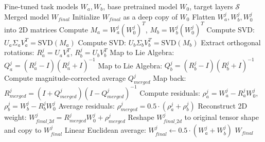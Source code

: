 \documentclass{article}
\begin{document}
\begin{algorithm}[tb]
\caption{Selective OrthoMerge (S-OM)}
\label{alg:selective_orthomerge}
\begin{algorithmic}[1]
 Fine-tuned task models $W_a, W_b$, base pretrained model $W_0$, target layers $\mathcal{S}$
 Merged model $W_{final}$
\STATE Initialize $W_{final}$ as a deep copy of $W_0$
        \STATE Flatten $W^j_a, W^j_b, W^j_0$ into 2D matrices
        \STATE Compute $M_a = W^j_a (W^j_0)^T$, $M_b = W^j_b (W^j_0)^T$
        \STATE Compute SVD: $U_a \Sigma_a V_a^T = \text{SVD}(M_a)$
        \STATE Compute SVD: $U_b \Sigma_b V_b^T = \text{SVD}(M_b)$
        \STATE Extract orthogonal rotations: $R^j_a = U_a V_a^T$, $R^j_b = U_b V_b^T$
        \STATE Map to Lie Algebra: $Q^j_a = (R^j_a - I)(R^j_a + I)^{-1}$
        \STATE Map to Lie Algebra: $Q^j_b = (R^j_b - I)(R^j_b + I)^{-1}$
        \STATE Compute magnitude-corrected average $Q^j_{merged}$
        \STATE Map back: $R^j_{merged} = (I + Q^j_{merged})(I - Q^j_{merged})^{-1}$
        \STATE Compute residuals: $\rho^j_a = W^j_a - R^j_a W^j_0$, $\rho^j_b = W^j_b - R^j_b W^j_0$
        \STATE Average residuals: $\rho^j_{merged} = 0.5 \cdot (\rho^j_a + \rho^j_b)$
        \STATE Reconstruct 2D weight: $W^j_{final\_2d} = R^j_{merged} W^j_0 + \rho^j_{merged}$
        \STATE Reshape $W^j_{final\_2d}$ to original tensor shape and copy to $W^j_{final}$
    \ELSE
        \STATE Linear Euclidean average: $W^j_{final} \leftarrow 0.5 \cdot (W^j_a + W^j_b)$
    \ENDIF
\ENDFOR
{} $W_{final}$
\end{algorithmic}
\end{algorithm}
\vspace{-10pt}
\end{document}
